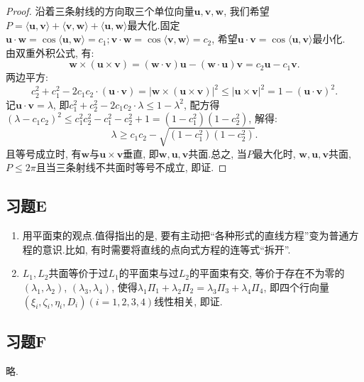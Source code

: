 \documentclass[./main.tex]{subfiles}
\begin{document}
\begin{enumerate}
        \begin{proof} 沿着三条射线的方向取三个单位向量$\mathbf{u},\mathbf{v},\mathbf{w}$, 我们希望$P=\langle\mathbf{u},\mathbf{v}\rangle+\langle\mathbf{v},\mathbf{w}\rangle+\langle\mathbf{u},\mathbf{w}\rangle$最大化.固定$\mathbf{u}\cdot\mathbf{w}=\cos{\langle\mathbf{u},\mathbf{w}\rangle}=c_1;\mathbf{v}\cdot\mathbf{w}=\cos{\langle\mathbf{v},\mathbf{w}\rangle}=c_2$, 希望$\mathbf{u}\cdot\mathbf{v}=\cos{\langle\mathbf{u},\mathbf{v}\rangle}$最小化.\\由双重外积公式, 有: $$\mathbf{w}\times (\mathbf{u}\times \mathbf{v})=(\mathbf{w}\cdot\mathbf{v})\mathbf{u}-(\mathbf{w}\cdot\mathbf{u})\mathbf{v}=c_2\mathbf{u}-c_1\mathbf{v}.$$两边平方: $$c_2^2+c_1^2-2c_1c_2\cdot (\mathbf{u}\cdot\mathbf{v})=|\mathbf{w}\times (\mathbf{u}\times \mathbf{v})|^2\leq |\mathbf{u}\times \mathbf{v}|^2=1-(\mathbf{u}\cdot\mathbf{v})^2.$$记$\mathbf{u}\cdot\mathbf{v}=\lambda$, 即$c_1^2+c_2^2-2c_1c_2\cdot\lambda\leq 1-\lambda^2$, 配方得$(\lambda-c_1c_2)^2\leq c_1^2c_2^2-c_1^2-c_2^2+1=(1-c_1^2)(1-c_2^2)$, 解得: $$\lambda\ge c_1c_2-\sqrt{(1-c_1^2)(1-c_2^2)}.$$且等号成立时, 有$\mathbf{w}$与$\mathbf{u}\times \mathbf{v}$垂直, 即$\mathbf{w},\mathbf{u},\mathbf{v}$共面.总之, 当$P$最大化时, $\mathbf{w},\mathbf{u},\mathbf{v}$共面, $P\leq 2\pi$且当三条射线不共面时等号不成立, 即证.\end{proof}
\end{enumerate}

\subsection*{习题E}
\begin{enumerate}
    \item 用平面束的观点.值得指出的是, 要有主动把``各种形式的直线方程''变为普通方程的意识.比如, 有时需要将直线的点向式方程的连等式``拆开''.
    \item $L_1,L_2$共面等价于过$L_1$的平面束与过$L_2$的平面束有交, 等价于存在不为零的$(\lambda_1,\lambda_2)$, $(\lambda_3,\lambda_4)$, 使得$\lambda_1\Pi_1+\lambda_2\Pi_2=\lambda_3\Pi_3+\lambda_4\Pi_4$, 即四个行向量$(\xi_i,\zeta_i,\eta_i,D_i)(i=1,2,3,4)$线性相关, 即证.
\end{enumerate}

\subsection*{习题F}
略.
\end{document}
